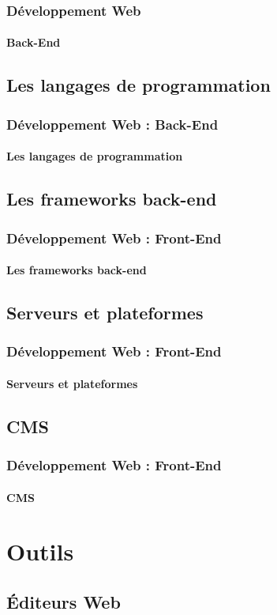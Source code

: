\documentclass[xcolor=table]{beamer}
\begin{document}
\begin{frame}
\frametitle{Développement Web}
\framesubtitle{Back-End}


\end{frame}

\subsection{Les langages de programmation}

\begin{frame}
\frametitle{Développement Web : Back-End}
\framesubtitle{Les langages de programmation}

\end{frame}

\subsection{Les frameworks back-end}

\begin{frame}
\frametitle{Développement Web : Front-End}
\framesubtitle{Les frameworks back-end}

\end{frame}

\subsection{Serveurs et plateformes}

\begin{frame}
\frametitle{Développement Web : Front-End}
\framesubtitle{Serveurs et plateformes}

\end{frame}

\subsection{CMS}

\begin{frame}
\frametitle{Développement Web : Front-End}
\framesubtitle{CMS}

\end{frame}

\section{Outils}

\subsection{Éditeurs Web}
\end{document}

